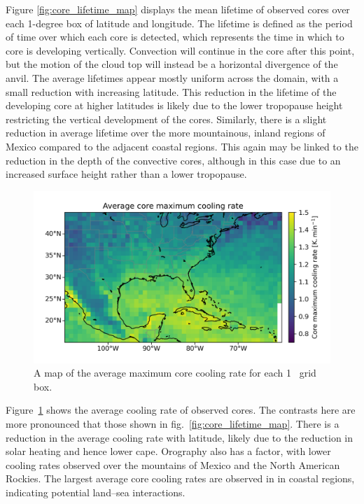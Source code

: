 Figure \ref{fig:core_lifetime_map} displays the mean lifetime of observed cores over each 1-degree box of latitude and longitude.
The lifetime is defined as the period of time over which each core is detected, which represents the time in which to core is developing vertically.
Convection will continue in the core after this point, but the motion of the cloud top will instead be a horizontal divergence of the anvil.
The average lifetimes appear mostly uniform across the domain, with a small reduction with increasing latitude.
This reduction in the lifetime of the developing core at higher latitudes is likely due to the lower tropopause height restricting the vertical development of the cores.
Similarly, there is a slight reduction in average lifetime over the more mountainous, inland regions of Mexico compared to the adjacent coastal regions.
This again may be linked to the reduction in the depth of the convective cores, although in this case due to an increased surface height rather than a lower tropopause.


\begin{figure}[tp]
    \centering
    \includegraphics[width=\textwidth]{figures/chapter2_07.png}
    \caption[
    A map of the average maximum core cooling rate for each 1
    \textdegree\ grid box
    ]{
    A map of the  average maximum core cooling rate for each 1
    \textdegree\ grid box.
    }
    \label{fig:core_cooling_rate_map}
\end{figure}

Figure~\ref{fig:core_cooling_rate_map} shows the average cooling rate of observed cores.
The contrasts here are more pronounced that those shown in fig.~\ref{fig:core_lifetime_map}.
There is a reduction in the average cooling rate with latitude, likely due to the reduction in solar heating and hence lower \acrshort{cape}.
Orography also has a factor, with lower cooling rates observed over the mountains of Mexico and the North American Rockies.
The largest average core cooling rates are observed in in coastal regions, indicating potential land--sea interactions.

